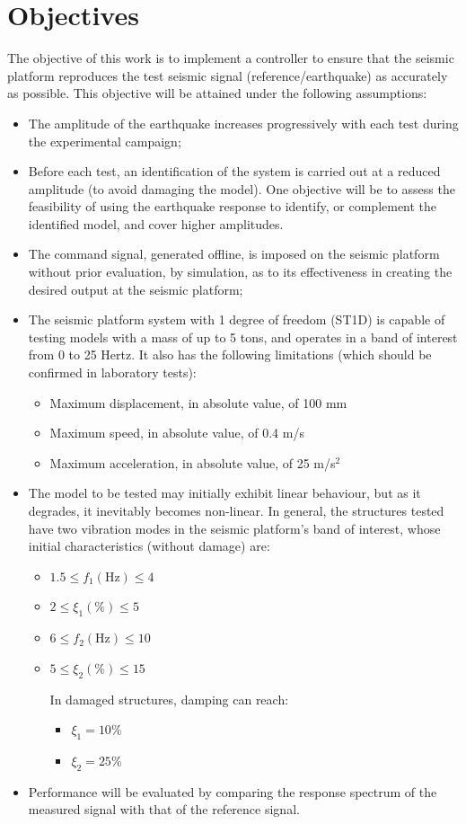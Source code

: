 \documentclass[  10pt, twoside]{report} %
\numberwithin{equation}{chapter}
\begin{document}
\section{Objectives}
The objective of this work is to implement a controller to ensure that the seismic platform reproduces the test seismic signal (reference/earthquake) as accurately as possible. This objective will be attained under the following assumptions:
\begin{itemize}
    \item The amplitude of the earthquake increases progressively with each test during the experimental campaign;
    \item Before each test, an identification of the system is carried out at a reduced amplitude (to avoid damaging the model). One objective will be to assess the feasibility of using the earthquake response to identify, or complement the identified model, and cover higher amplitudes.
    \item The command signal, generated offline, is imposed on the seismic platform without prior evaluation, by simulation, as to its effectiveness in creating the desired output at the seismic platform;
    \item The seismic platform system with 1 degree of freedom (ST1D) is capable of testing models with a mass of up to 5 tons, and operates in a band of interest from 0 to 25 Hertz. It also has the following limitations (which should be confirmed in laboratory tests):
    \begin{itemize}
        \item Maximum displacement, in absolute value, of 100 mm
            \item Maximum speed, in absolute value, of 0.4 m/s
        \item Maximum acceleration, in absolute value, of 25 m/s$^2$
    \end{itemize}
    \item The model to be tested may initially exhibit linear behaviour, but as it degrades, it inevitably becomes non-linear. In general, the structures tested have two vibration modes in the seismic platform's band of interest, whose initial characteristics (without damage) are:
    \begin{itemize}[label=$\diamond$]
    \item $1.5 \leq f_1 (\mathrm{Hz}) \leq 4$
    \item $2 \leq \xi_1 (\%) \leq 5$
    \item $6 \leq f_2 (\mathrm{Hz}) \leq 10$
    \item $5 \leq \xi_2 (\%) \leq 15$
    
    In damaged structures, damping can reach:
    \begin{itemize}
        \item $\xi_1 = 10\%$
        \item $\xi_2 = 25\%$
    \end{itemize}
    \end{itemize}

    \item Performance will be evaluated by comparing the response spectrum of the measured signal with that of the reference signal.
\end{itemize}
\end{document}
